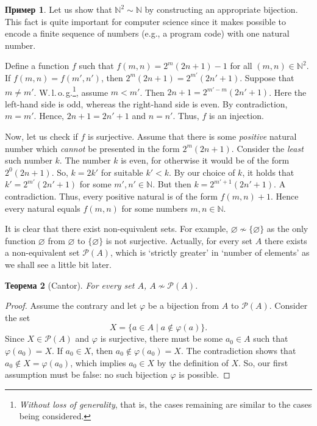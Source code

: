 \documentclass[12pt,notitlepage]{article}
\theoremstyle{plain}
\newtheorem{thm}{Теорема}[section]
\theoremstyle{definition}
\newtheorem{exm}[thm]{Пример}
\theoremstyle{plain}
\newcommand{\N}{\mathbb{N}}
\newcommand{\void}{\varnothing}
\newcommand{\mP}{\mathcal{P}}
\renewcommand{\phi}{\varphi}
\newcommand{\1}{\mathbf{1}}
\newcommand{\0}{\mathbf{0}}
\begin{document}
\begin{exm}\label{ch0:N_sq}
	Let us show that $\N^2 \sim \N$ by constructing an appropriate bijection. This fact is quite important for computer science since it makes possible to encode a finite sequence of numbers (e.g., a program code) with one natural number.
	
	Define a function $f$ such that $f(m,n) = 2^m(2n + 1) - 1$ for all $(m,n) \in \N^2$. If $f(m,n) = f(m',n')$, then $2^m(2n + 1) = 2^{m'}(2n' + 1)$. Suppose that $m \neq m'$. W.\,l.\,o.\,g.\footnote{\emph{Without loss of generality}, that is, the cases remaining are similar to the cases being considered.}, assume $m < m'$. Then $2n + 1 = 2^{m' - m}(2n' + 1)$. Here the left-hand side is odd, whereas the right-hand side is even. By contradiction, $m = m'$. Hence, $2n + 1 = 2n' + 1$ and $n = n'$. Thus, $f$ is an injection.
	
	Now, let us check if $f$ is surjective. Assume that there is some \emph{positive} natural number which \emph{cannot}  be presented in the form $2^m (2n + 1)$. Consider the \emph{least} such number $k$. The number $k$ is even, for otherwise it would be of the form $2^0 (2n + 1)$. So, $k = 2k'$ for suitable $k' < k$. By our choice of $k$, it holds that $k' = 2^{m'}(2n' + 1)$ for some $m',n' \in \N$. But then $k = 2^{m' + 1}(2n' + 1)$. A contradiction. Thus, every positive natural is of the form $f(m,n) + 1$. Hence every natural equals $f(m,n)$ for some numbers $m,n \in \N$.
\end{exm}

It is clear that there exist non-equivalent sets. For example, $\void \nsim \{ \void \}$ as the only function $\void$ from $\void$ to $\{ \void \}$ is not surjective. Actually, for every set $A$ there exists a non-equivalent set $\mP(A)$, which is `strictly greater' in `number of elements' as we shall see a little bit later.
\begin{thm}[Cantor]\label{L9:t_cantor}
	For every set $A$, $A \nsim \mP(A)$.
\end{thm}
\begin{proof}
	Assume the contrary and let $\phi$ be a bijection from $A$ to $\mP(A)$. Consider the set
	$$X = \{ a \in A \mid a \notin \phi(a) \}.$$
	Since $X \in \mP(A)$ and $\phi$ is surjective, there must be some $a_0 \in A$ such that $\phi(a_0) = X$. If $a_0 \in X$, then $a_0 \notin \phi(a_0) = X$. The contradiction shows that $a_0 \notin X = \phi(a_0)$, which implies $a_0 \in X$ by the definition of $X$. So, our first assumption must be false: no such bijection $\phi$ is possible.
\end{proof}
\end{document}
